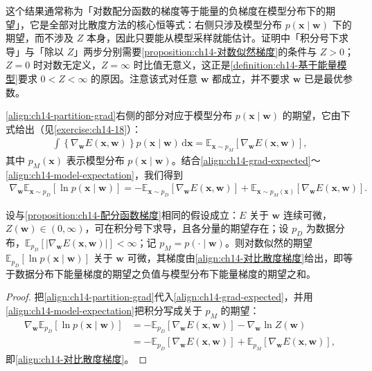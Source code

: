 \documentclass[../../main.tex]{subfiles}
\begin{document}
\begin{remark}这个结果通常称为「对数配分函数的梯度等于能量的负梯度在模型分布下的期望」，它是全部对比散度方法的核心恒等式：右侧只涉及模型分布 $p(\bm{x}\mid\bm{w})$ 下的期望，而不涉及 $Z$ 本身，因此只要能从模型采样就能估计。证明中「积分号下求导」与「除以 $Z$」两步分别需要\cref{proposition:ch14-对数似然梯度}的条件与 $Z>0$；$Z=0$ 时对数无定义，$Z=\infty$ 时比值无意义，这正是\cref{definition:ch14-基于能量模型}要求 $0<Z<\infty$ 的原因。注意该式对任意 $\bm{w}$ 都成立，并不要求 $\bm{w}$ 已是最优参数。
\end{remark}

\eqref{align:ch14-partition-grad}右侧的部分对应于模型分布 $p(\bm{x}\mid\bm{w})$ 的期望，它由下式给出（见\cref{exercise:ch14-18}）：
\begin{align}
\int\left\{\nabla_{\bm{w}}E(\bm{x},\bm{w})\right\}p(\bm{x}\mid\bm{w})\,\mathrm{d}\bm{x}=\mathbb{E}_{\bm{x}\sim p_{M}}\left[\nabla_{\bm{w}}E(\bm{x},\bm{w})\right],
\label{align:ch14-model-expectation}
\end{align}
其中 $p_{M}(\bm{x})$ 表示模型分布 $p(\bm{x}\mid\bm{w})$。结合\eqref{align:ch14-grad-expected}～\eqref{align:ch14-model-expectation}，我们得到
\begin{align}
\nabla_{\bm{w}}\mathbb{E}_{\bm{x}\sim p_{D}}\left[\ln p(\bm{x}\mid\bm{w})\right]=-\mathbb{E}_{\bm{x}\sim p_{D}}\left[\nabla_{\bm{w}}E(\bm{x},\bm{w})\right]+\mathbb{E}_{\bm{x}\sim p_{M}(\bm{x})}\left[\nabla_{\bm{w}}E(\bm{x},\bm{w})\right].
\label{align:ch14-对比散度梯度}
\end{align}

\begin{theorem}[对比散度梯度]\label{theorem:ch14-对比散度梯度}
设与\cref{proposition:ch14-配分函数梯度}相同的假设成立：$E$ 关于 $\bm{w}$ 连续可微，$Z(\bm{w})\in(0,\infty)$，可在积分号下求导，且各分量的期望存在；设 $p_{D}$ 为数据分布，$\mathbb{E}_{p_{D}}\left[\left|\nabla_{\bm{w}}E(\bm{x},\bm{w})\right|\right]<\infty$；记 $p_{M}=p(\cdot\mid\bm{w})$。则对数似然的期望 $\mathbb{E}_{p_{D}}\left[\ln p(\bm{x}\mid\bm{w})\right]$ 关于 $\bm{w}$ 可微，其梯度由\eqref{align:ch14-对比散度梯度}给出，即等于数据分布下能量梯度的期望之负值与模型分布下能量梯度的期望之和。
\end{theorem}

\begin{proof}
把\eqref{align:ch14-partition-grad}代入\eqref{align:ch14-grad-expected}，并用\eqref{align:ch14-model-expectation}把积分写成关于 $p_{M}$ 的期望：
\begin{align*}
\nabla_{\bm{w}}\mathbb{E}_{p_{D}}\left[\ln p(\bm{x}\mid\bm{w})\right]&=-\mathbb{E}_{p_{D}}\left[\nabla_{\bm{w}}E(\bm{x},\bm{w})\right]-\nabla_{\bm{w}}\ln Z(\bm{w})\\
&=-\mathbb{E}_{p_{D}}\left[\nabla_{\bm{w}}E(\bm{x},\bm{w})\right]+\mathbb{E}_{p_{M}}\left[\nabla_{\bm{w}}E(\bm{x},\bm{w})\right],
\end{align*}
即\eqref{align:ch14-对比散度梯度}。
\end{proof}
\end{document}
